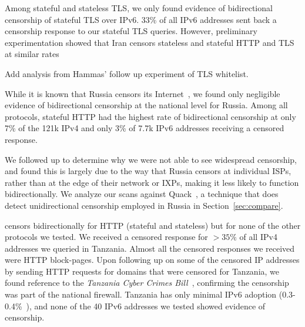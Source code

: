 Among stateful and stateless TLS, we only found evidence of bidirectional censorship of stateful TLS over IPv6. 33\% of all IPv6 addresses sent back a censorship response to our stateful TLS queries. However, preliminary experimentation showed that Iran censors stateless and stateful HTTP and TLS at similar rates {{\color{red} Add analysis from Hammas' follow up experiment of TLS whitelist}. 


While it is known that Russia censors its
Internet~\cite{ramesh2020decentralized}, we found only negligible evidence of
bidirectional censorship at the national level for Russia. Among all protocols,
stateful HTTP had the highest rate of bidirectional censorship at only 7\% of
the 121k IPv4 and only 3\% of 7.7k IPv6 addresses receiving a censored response.

We followed up to determine why we were not able to see widespread censorship,
and found this is largely due to the way that Russia censors at individual ISPs,
rather than at the edge of their network or IXPs, making it less likely to
function bidirectionally. We analyze our scans against
Quack~\cite{vandersloot2018quack}, a technique that does
detect unidirectional censorship employed in Russia in
Section~\ref{sec:compare}.


 censors bidirectionally for HTTP (stateful and stateless) but
for none of the other protocols we tested. We received a censored response for
$>35\%$ of all IPv4 addresses we queried in Tanzania. Almost all the censored
responses we received were HTTP block-pages. Upon following up on some of the
censored IP addresses by sending HTTP requests for domains that were censored
for Tanzania, we found reference to the \textit{Tanzania Cyber Crimes
Bill}~\cite{Tanzania45:online}, confirming the censorship was part of the
national firewall. Tanzania has only minimal IPv6 adoption
(0.3-0.4\%~\cite{akamai-ipv6,Google-IPv6}), and none of the 40 IPv6 addresses we
tested showed evidence of censorship.

%

}
